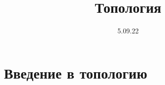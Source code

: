 \documentclass[11pt,fleqn]{book}
\author{}
\title{Топология}
\date{5.09.22}
\begin{document}
\maketitle
\tableofcontents
\newpage
\chapter{Введение в топологию}




\end{document}
